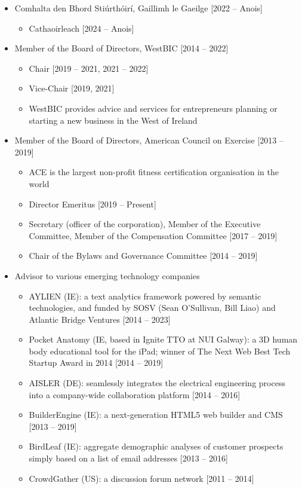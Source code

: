 \documentclass[10pt,a4paper]{res} %
\begin{document}
\begin{resume}
\begin{itemize} \itemsep -2pt
\item Comhalta den Bhord Sti\'{u}rth\'{o}ir\'{i}, Gaillimh le Gaeilge [2022 -- Anois]
\begin{itemize} \itemsep -2pt
\item Cathaoirleach [2024 -- Anois]
\end{itemize}
\item Member of the Board of Directors, WestBIC [2014 -- 2022]
\begin{itemize} \itemsep -2pt
\item Chair [2019 -- 2021, 2021 -- 2022]
\item Vice-Chair [2019, 2021]
\item WestBIC provides advice and services for entrepreneurs planning or starting a new business in the West of Ireland
\end{itemize}
\item Member of the Board of Directors, American Council on Exercise [2013 -- 2019]
\begin{itemize} \itemsep -2pt
\item ACE is the largest non-profit fitness certification organisation in the world
\item Director Emeritus [2019 -- Present]
\item Secretary (officer of the corporation), Member of the Executive Committee, Member of the Compensation Committee [2017 -- 2019]
\item Chair of the Bylaws and Governance Committee [2014 -- 2019]
\end{itemize}
\item Advisor to various emerging technology companies
\begin{itemize} \itemsep -2pt
\item AYLIEN (IE): a text analytics framework powered by semantic technologies, and funded by SOSV (Sean O'Sullivan, Bill Liao) and Atlantic Bridge Ventures [2014 -- 2023]
\item Pocket Anatomy (IE, based in Ignite TTO at NUI Galway): a 3D human body educational tool for the iPad; winner of The Next Web Best Tech Startup Award in 2014 [2014 -- 2019]
\item AISLER (DE): seamlessly integrates the electrical engineering process into a company-wide collaboration platform [2014 -- 2016]
\item BuilderEngine (IE): a next-generation HTML5 web builder and CMS [2013 -- 2019]
\item BirdLeaf (IE): aggregate demographic analyses of customer prospects simply based on a list of email addresses [2013 -- 2016]
\item CrowdGather (US): a discussion forum network [2011 -- 2014]
\end{itemize}
\end{itemize}


\end{resume}
\end{document}
